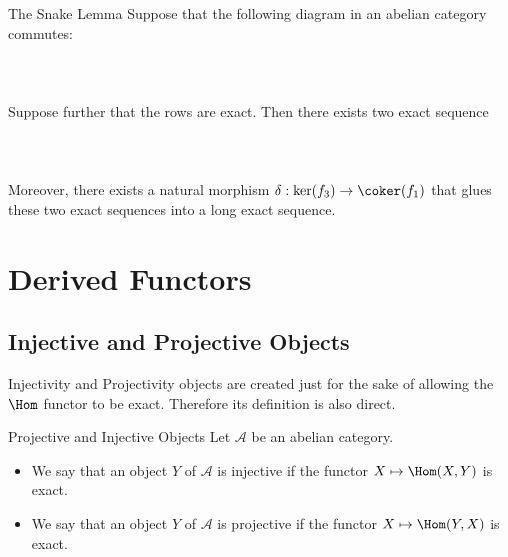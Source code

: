 \documentclass[a4paper]{article}
\begin{document}
\begin{lmm}{The Snake Lemma}{} Suppose that the following diagram in an abelian category commutes: \\~\\
\\~\\
Suppose further that the rows are exact. Then there exists two exact sequence \\~\\
\\~\\
Moreover, there exists a natural morphism $\delta:\ker(f_3)\to\coker(f_1)$ that glues these two exact sequences into a long exact sequence. 
\end{lmm}

\pagebreak
\section{Derived Functors}
\subsection{Injective and Projective Objects}
Injectivity and Projectivity objects are created just for the sake of allowing the $\Hom$ functor to be exact. Therefore its definition is also direct. 

\begin{defn}{Projective and Injective Objects}{} Let $\mathcal{A}$ be an abelian category. 
\begin{itemize}
\item We say that an object $Y$ of $\mathcal{A}$ is injective if the functor $X\mapsto\Hom(X,Y)$ is exact. 
\item We say that an object $Y$ of $\mathcal{A}$ is projective if the functor $X\mapsto\Hom(Y,X)$ is exact. 
\end{itemize}
\end{defn}
\end{document}
